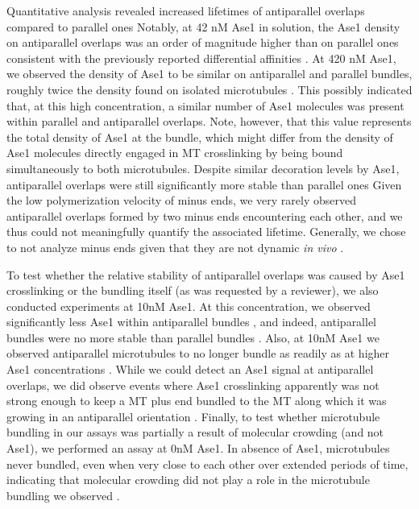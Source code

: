 Quantitative analysis revealed increased lifetimes of antiparallel overlaps compared to parallel ones  Notably, at 42 nM Ase1 in solution, the Ase1 density on antiparallel overlaps was an order of magnitude higher than on parallel ones  consistent with the previously reported differential affinities \parencite{Janson2007}. At 420 nM Ase1, we observed the density of Ase1 to be similar on antiparallel and parallel bundles, roughly twice the density found on isolated microtubules . This possibly indicated that, at this high concentration, a similar number of Ase1 molecules was present within parallel and antiparallel overlaps. Note, however, that this value represents the total density of Ase1 at the bundle, which might differ from the density of Ase1 molecules directly engaged in MT crosslinking by being bound simultaneously to both microtubules. Despite similar decoration levels by Ase1, antiparallel overlaps were still significantly more stable than parallel ones  Given the low polymerization velocity of minus ends, we very rarely observed antiparallel overlaps formed by two minus ends encountering each other, and we thus could not meaningfully quantify the associated lifetime. Generally, we chose to not analyze minus ends given that they are not dynamic \textit{in vivo} \parencite{dammer}.\par

To test whether the relative stability of antiparallel overlaps was caused by Ase1 crosslinking or the bundling itself (as was requested by a reviewer), we also conducted experiments at 10nM Ase1. At this concentration, we observed significantly less Ase1 within antiparallel bundles , and indeed, antiparallel bundles were no more stable than parallel bundles . Also, at 10nM Ase1 we observed antiparallel microtubules to no longer bundle as readily as at higher Ase1 concentrations . While we could detect an Ase1 signal at antiparallel overlaps, we did observe events where Ase1 crosslinking apparently was not strong enough to keep a MT plus end bundled to the MT along which it was growing in an antiparallel orientation . Finally, to test whether microtubule bundling in our assays was partially a result of molecular crowding (and not Ase1), we performed an assay at 0nM Ase1. In absence of Ase1, microtubules never bundled, even when very close to each other over extended periods of time, indicating that molecular crowding did not play a role in the microtubule bundling we observed . \par

